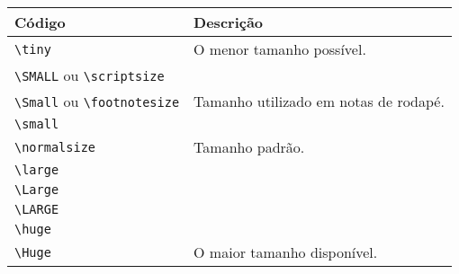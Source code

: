 % 
% 
% 
% 
% 
\begin{tabular}{lp{}}
    \hline
    Código & Descrição \\ \hline
    \lstinline!\tiny! & O menor tamanho possível. \\
    \lstinline!\SMALL! ou \lstinline!\scriptsize! &  \\
    \lstinline!\Small! ou \lstinline!\footnotesize! & Tamanho utilizado em notas de rodapé. \\
    \lstinline!\small! &  \\
    \lstinline!\normalsize! & Tamanho padrão. \\
    \lstinline!\large! & \\
    \lstinline!\Large! & \\
    \lstinline!\LARGE! & \\
    \lstinline!\huge! & \\
    \lstinline!\Huge! & O maior tamanho disponível. \\ \hline
\end{tabular}
